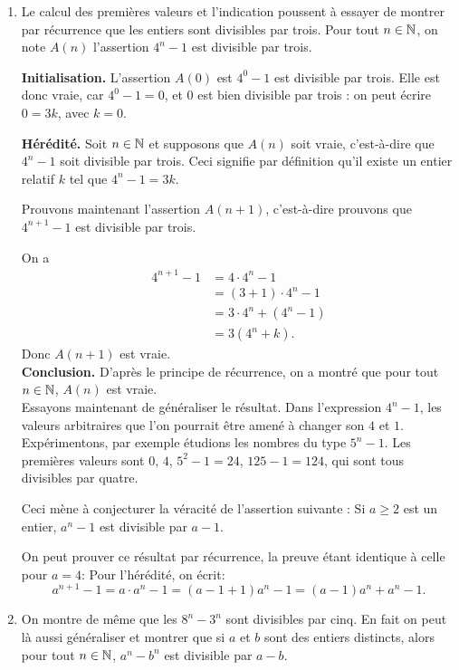 \begin{exo}[Divisibilité]
\begin{sol}
\begin{enumerate}
\item Le calcul des premières valeurs et l'indication poussent à essayer de montrer par récurrence que les entiers sont divisibles par trois. Pour tout $n\in \mathbb N$, on note $A(n)$ l'assertion \og $4^n-1$ est divisible par trois.\fg

\textbf{Initialisation.} L'assertion $A(0)$ est \og $4^0-1$ est divisible par trois\fg. Elle est donc vraie, car $4^0-1=0$, et $0$ est bien divisible par trois : on peut écrire $0=3k$, avec $k=0$.

\textbf{Hérédité.} Soit $n\in \mathbb N$ et supposons que $A(n)$ soit vraie, c'est-à-dire que $4^n-1$ soit divisible par trois. Ceci signifie par définition qu'il existe un entier relatif $k$ tel que $4^n-1=3k$. 

Prouvons maintenant l'assertion $A(n+1)$, c'est-à-dire prouvons que $4^{n+1}-1$ est divisible par trois.

On a 
\begin{align*}
4^{n+1}-1 &= 4\cdot 4^n - 1\\
		  &= (3+1)\cdot 4^n - 1\\
		  &= 3\cdot 4^n + (4^n-1)\\
		  &= 3(4^n+k).
\end{align*}
Donc $A(n+1)$ est vraie.\\
\textbf{Conclusion.} D'après le principe de récurrence, on a montré que pour tout $n\in \mathbb N$, $A(n)$ est vraie.\\



Essayons maintenant de généraliser le résultat. Dans l'expression $4^n-1$, les valeurs arbitraires que l'on pourrait être amené à changer son $4$ et $1$. Expérimentons, par exemple étudions les nombres du type $5^n-1$. Les premières valeurs sont $0$, $4$, $5^2-1=24$, $125-1=124$, qui sont tous divisibles par quatre. 

Ceci mène à conjecturer la véracité de l'assertion suivante : \og Si $a\geq 2$ est un entier, $a^n-1$ est divisible par $a-1$.\fg

On peut prouver ce résultat par récurrence, la preuve étant identique à celle pour $a=4$: Pour l'hérédité, on écrit:
\[ a^{n+1}-1 = a\cdot a^n-1 = (a-1+1)a^n-1= (a-1)a^n + a^n-1.\]

\item On montre de même que les $8^n-3^n$ sont divisibles par cinq. En fait on peut là aussi généraliser et montrer que si $a$ et $b$ sont des entiers distincts, alors pour tout $n\in \mathbb N$, $a^n-b^n$ est divisible par $a-b$.


\end{enumerate}
\end{sol}
\end{exo}

